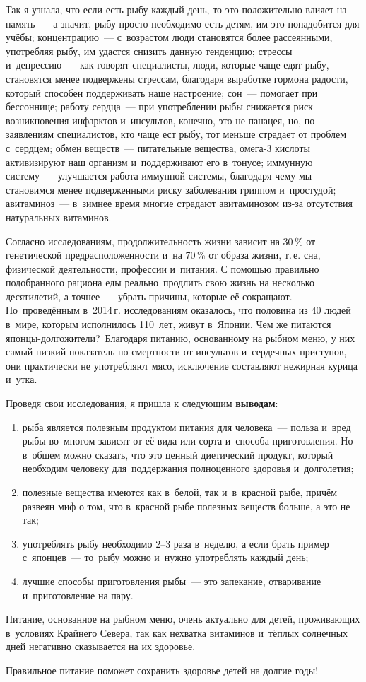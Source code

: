 Так я узнала, что если есть рыбу каждый день, то это положительно влияет на память~--- а значит, рыбу просто необходимо есть детям, им это понадобится для учёбы; концентрацию~---  с~возрастом люди становятся более рассеянными, употребляя рыбу, им удастся снизить данную тенденцию; стрессы и~депрессию~--- как говорят специалисты, люди, которые чаще едят рыбу, становятся менее подвержены стрессам, благодаря выработке гормона радости, который способен поддерживать наше настроение; сон~--- помогает при бессоннице; работу сердца~--- при употреблении рыбы снижается риск возникновения инфарктов и~инсультов, конечно, это не панацея, но, по заявлениям специалистов, кто чаще ест рыбу, тот меньше страдает от проблем с~сердцем; обмен веществ~--- питательные вещества, омега-3 кислоты активизируют наш организм и~поддерживают его в~тонусе; иммунную систему~--- улучшается работа иммунной системы, благодаря чему мы становимся менее подверженными риску заболевания гриппом и~простудой; авитаминоз~--- в~зимнее время многие страдают авитаминозом из-за отсутствия натуральных витаминов.

Согласно исследованиям, продолжительность жизни зависит на 30\,\% от генетической предрасположенности и~на 70\,\% от образа жизни, т.\,е. сна, физической деятельности, профессии и~питания. С помощью правильно подобранного рациона еды реально продлить свою жизнь на несколько десятилетий, а точнее~--- убрать причины, которые её сокращают. По~проведённым в~2014\,г. исследованиям оказалось, что половина из 40 людей в~мире, которым исполнилось 110~лет, живут в~Японии. Чем же питаются японцы-долгожители? Благодаря питанию, основанному на рыбном меню, у них самый низкий показатель по смертности от инсультов и~сердечных приступов, они практически не употребляют мясо, исключение составляют нежирная курица и~утка. 

Проведя свои исследования, я пришла к следующим \textbf{выводам}:
\begin{enumerate}[noitemsep]\vspace{-6pt}
\item рыба является полезным продуктом питания для человека~--- польза и~вред рыбы во~многом зависят от её вида или сорта и~способа приготовления. Но в~общем можно сказать, что это ценный диетический продукт, который необходим человеку для~поддержания полноценного здоровья и~долголетия;
\item полезные вещества имеются как в~белой, так и~в~красной рыбе,  причём развеян миф о том, что в~красной рыбе полезных веществ больше, а это не так;
\item употреблять рыбу необходимо 2--3 раза в~неделю, а если брать пример с~японцев~--- то~рыбу можно и~нужно употреблять каждый день;
\item лучшие способы приготовления рыбы~--- это запекание, отваривание и~приготовление на пару.
\end{enumerate}\vspace{-6pt}

Питание, основанное на рыбном меню, очень актуально для детей, проживающих в~условиях Крайнего Севера, так как нехватка витаминов и~тёплых солнечных дней негативно сказывается на их здоровье.

Правильное питание поможет сохранить здоровье детей на долгие годы!
